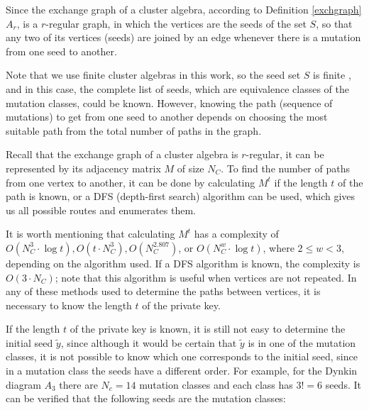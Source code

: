 \documentclass[12pt,a4paper]{article}
\begin{document}
Since the exchange graph of a cluster algebra, according to Definition \ref{exchgraph} $A_r$, is a $r$-regular graph, in which the vertices are the seeds of the set $S$, so that any two of its vertices (seeds) are joined by an edge whenever there is a mutation from one seed to another.

Note that we use finite cluster algebras in this work, so  the seed set $S$ is finite \cite[Theorem 5.6.1]{Marsh}, and in this case, the complete list of seeds, which are equivalence classes of the mutation classes, could be known. However, knowing the path (sequence of mutations) to get from one seed to another depends on choosing the most suitable path from the total number of paths in the graph.

Recall that the exchange graph of a cluster algebra is $r$-regular, it can be represented by its adjacency matrix  $M$ of size $N_C$. To find the number of paths from one vertex to another, it can be done by calculating $M^t$ if the length $t$ of the path is known, or a DFS (depth-first search) algorithm can be used, which gives us all possible routes and enumerates them.

It is  worth mentioning that calculating $M^t$ has a complexity of $O(N_C^3\cdot \log t), O(t\cdot N_C^3), O(N_C^{2.807})$, or $O(N_C^w\cdot \log t)$, where $2\le w<3$, depending on the algorithm used. If a DFS algorithm is known, the complexity is $O(3\cdot N_C)$; note that this algorithm is useful when vertices are not repeated. In any of these methods used to determine the paths between vertices, it is necessary to know the length $t$ of the private key.

If the length $t$ of the private key is known, it is still not easy to determine the initial seed $\tilde{y}$, since although it would be certain that $\tilde{y}$ is in one of the mutation classes, it is not possible to know which one corresponds to the initial seed, since in a mutation class the seeds have a different order. For example, for the Dynkin diagram $A_3$ there are $N_c=14$ mutation classes and each class has $3!=6$ seeds. It can be verified that the following seeds are the mutation classes:
\end{document}
